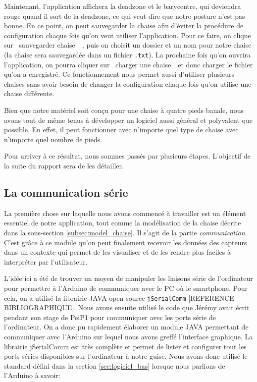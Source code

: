 \documentclass{polytech/polytech}
\begin{document}
Maintenant, l'application affichera la deadzone et le barycentre, qui deviendra rouge quand il sort de la deadzone, ce qui veut dire que notre posture n'est pas bonne.
 En ce point, on peut sauvegarder la chaise afin d'éviter la procédure de configuration chaque fois qu'on veut utiliser l'application. 
Pour ce faire, on clique sur \guillemotleft ~sauvegarder chaise~\guillemotright\ , puis on choisit un dossier et un nom pour notre chaise (la chaise sera sauvegardée dans un fichier \texttt{.txt}). 
La prochaine fois qu'on ouvrira l'application, on pourra cliquer sur \guillemotleft ~charger une chaise~\guillemotright\  et donc charger le fichier qu'on a enregistré.
 Ce fonctionnement nous permet aussi d'utiliser plusieurs chaises sans avoir besoin de changer la configuration chaque fois qu'on utilise une chaise différente.

Bien que notre matériel soit conçu pour une chaise à quatre pieds banale, nous avons tout de même tenus à développer un logiciel aussi général et polyvalent que possible.
En effet, il peut fonctionner avec n'importe quel type de chaise avec n'importe quel nombre de pieds.

Pour arriver à ce résultat, nous sommes passés par plusieurs étapes. L'objectif de la suite du rapport sera de les détailler.

\subsection{La communication série}
\label{subsec:comm_serie}
La première chose sur laquelle nous avons commencé à travailler est un élément essentiel de notre application, tout comme la modélisation de la chaise décrite dans la sous-section \ref{subsec:model_chaise}. Il s'agit de la partie \textit{communication}. C'est grâce à ce module qu'on peut finalement recevoir les données des capteurs dans un contexte qui permet de les visualiser et de les rendre plus faciles à interpréter par l'utilisateur.

L'idée ici a été de trouver un moyen de manipuler les liaisons série de l'ordinateur pour permettre à l'Arduino de communiquer avec le PC où le smartphone.
Pour cela, on a utilisé la librairie JAVA open-source \texttt{jSerialComm} [REFERENCE BIBLIOGRAPHIQUE]. Nous avons ensuite utilisé le code que Jérémy avait écrit pendant son stage de PeiP1 pour communiquer avec les ports série de l'ordinateur. On a donc pu rapidement élaborer un module JAVA permettant de communiquer avec l'Arduino sur lequel nous avons greffé l'interface graphique. La librairie jSerialComm est très complète et permet de lister et configurer tout les ports séries disponibles sur l'ordinateur à notre guise. Nous avons donc utilisé le standard défini dans la section \ref{sec:logiciel_bas} lorsque nous parlions de l'Arduino à savoir:
\end{document}
